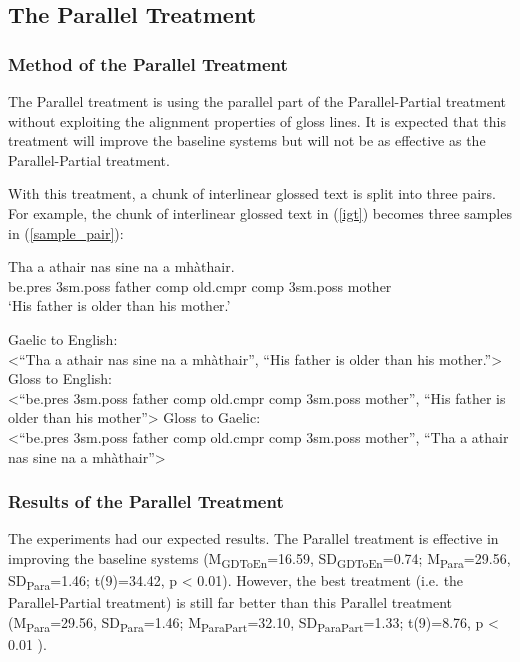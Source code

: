 \documentclass[a4paper]{article}
\begin{document}
\subsection{The Parallel Treatment}\label{treatment:Para}
\subsubsection{Method of the Parallel Treatment}
The Parallel treatment is using the parallel part of the Parallel-Partial treatment without exploiting the alignment properties of gloss lines.
It is expected that this treatment will improve the baseline systems but will not be as effective as the Parallel-Partial treatment.

With this treatment, a chunk of interlinear glossed text is split into three pairs. For example, the chunk of interlinear glossed text in (\ref{igt}) becomes three samples in (\ref{sample_pair}): 
\begin{exe} 
\ex \label{igt}
	\gll    Tha a athair nas sine na a mh\`athair.\\  
            be.pres 3sm.poss father comp old.cmpr comp 3sm.poss mother \\
    \glt    `His father is older than his mother.'  
\end{exe}


\begin{exe} 
	\ex \label{sample_pair}
	\begin{xlist}
		\ex Gaelic to English: \\<``Tha a athair nas sine na a mh\`athair'', ``His father is older than his mother.''>
		\ex Gloss to English: \\<``be.pres 3sm.poss father comp old.cmpr comp 3sm.poss mother'', ``His father is older than his mother''>
		\ex Gloss to Gaelic: \\<``be.pres 3sm.poss father comp old.cmpr comp 3sm.poss mother'', ``Tha a athair nas sine na a mh\`athair''>
	\end{xlist}
\end{exe}

\subsubsection{Results of the Parallel Treatment}\label{treatment:Para_result}
The experiments had our expected results.  
The Parallel treatment is effective in improving the baseline systems (M\textsubscript{GDToEn}=16.59, SD\textsubscript{GDToEn}=0.74; M\textsubscript{Para}=29.56, SD\textsubscript{Para}=1.46; t(9)=34.42, p < 0.01). 
However, the best treatment (i.e. the Parallel-Partial treatment) is still far better than this Parallel treatment 
(M\textsubscript{Para}=29.56, SD\textsubscript{Para}=1.46; M\textsubscript{ParaPart}=32.10, SD\textsubscript{ParaPart}=1.33; t(9)=8.76, p < 0.01 ).
\end{document}
